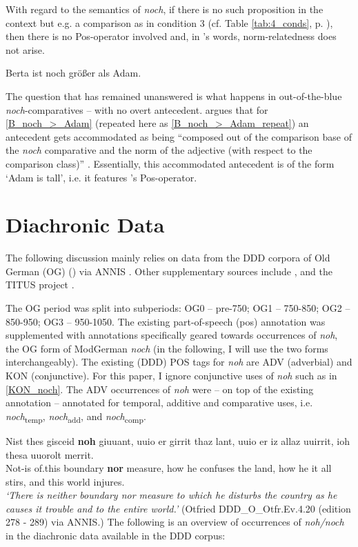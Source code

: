 \documentclass[output=paper,
modfonts
]{langscibook}
\begin{document}
With regard to the semantics of \textit{noch}, if there is no such proposition in the context but e.g. a comparison as in condition 3 (cf. Table \ref{tab:4_conds}, p. \pageref{tab:4_conds}), then there is no Pos-operator involved \citep[62]{stechow1984} and, in \citeauthor{umbach2009a_comp}'s words, norm-relatedness does not arise. 

\ea Berta ist noch größer als Adam. \label{B_noch_>_Adam_repeat}\z

The question that has remained unanswered is what happens in out-of-the-blue \textit{noch}-comparatives -- with no overt antecedent. \citeauthor{umbach2009a_comp} argues that for \ref{B_noch_>_Adam} (repeated here as \ref{B_noch_>_Adam_repeat}) an antecedent gets accommodated as being ``composed out of the comparison base of the \textit{noch} comparative and the norm of the adjective (with respect to the comparison class)'' \citep[10]{umbach2009a_comp}. Essentially, this accommodated antecedent is of the form `Adam is tall', i.e. it features \citeauthor{stechow2006}'s \citeyearpar{stechow2006} Pos-operator. 


\section{Diachronic Data}\label{sec_diachronic_data}


The following discussion mainly relies on data from the DDD corpora of Old German (OG) (\citeauthor{ddd_OG}) via ANNIS \citep{annis_og}. Other supplementary sources include \citep{kali}, and the TITUS project \citep{titus}.

The OG period was split into subperiods: OG0 -- pre-750; OG1 -- 750-850; OG2 -- 850-950; OG3 -- 950-1050. The existing part-of-speech (pos) annotation was supplemented with annotations specifically geared towards occurrences of \textit{noh}, the OG form of ModGerman \textit{noch} (in the following, I will use the two forms interchangeably). The existing (DDD) POS tags for \textit{noh} are ADV (adverbial) and KON (conjunctive). For this paper, I ignore conjunctive uses of \textit{noh} such as in \ref{KON_noch}. The ADV occurrences of \textit{noh} were -- on top of the existing annotation -- annotated for temporal, additive and comparative uses, i.e. \textit{noch}\textsubscript{temp}, \textit{noch}\textsubscript{add}, and \textit{noch}\textsubscript{comp}.


\ea\gll Nist thes gisceid \textbf{noh} giuuant, uuio er girrit thaz lant, uuio er iz allaz uuirrit, ioh thesa uuorolt merrit.\label{KON_noch}\\
       Not-is of.this boundary \textbf{nor} measure, how he confuses the land, how he it all stirs, and this world injures.\\
\glt   \textit{`There is neither boundary nor measure to which he disturbs the country as he causes it trouble and to the entire world.'} \flushright\vspace{-9pt} (Otfried DDD\_O\_Otfr.Ev.4.20 (edition 278 - 289) via ANNIS.) %
\z
The following is an overview of occurrences of \textit{noh\slash noch} in the diachronic data available in the DDD corpus:
\end{document}
